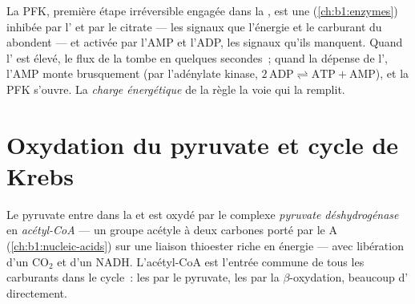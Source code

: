 \begin{proposition}\label{prop:b1:respiration-fermentation:pfk}
La PFK, première étape irréversible engagée dans la , est une
 (\cref{ch:b1:enzymes}) inhibée par l' et par le
citrate --- les signaux que l'énergie et le carburant du 
abondent --- et activée par l'AMP et l'ADP, les signaux qu'ils manquent.
Quand l' est élevé, le flux de la  tombe en quelques
secondes~; quand la  dépense de l', l'AMP monte brusquement
(par l'adénylate kinase,
$2\,\mathrm{ADP} \rightleftharpoons \mathrm{ATP} + \mathrm{AMP}$), et
la PFK s'ouvre. La \emph{charge énergétique} de la  règle la voie
qui la remplit.
\end{proposition}

\section{Oxydation du pyruvate et cycle de Krebs}

\begin{definition}\label{def:b1:respiration-fermentation:pdh}
Le pyruvate entre dans la  et est oxydé par le complexe
\emph{pyruvate déshydrogénase} en \emph{acétyl-CoA}
--- un groupe acétyle à deux carbones porté par le  A
(\cref{ch:b1:nucleic-acids}) sur une liaison thioester riche en énergie
--- avec libération d'un $\mathrm{CO_2}$ et d'un NADH. L'acétyl-CoA est
l'entrée commune de tous les carburants dans le cycle~: les  par
le pyruvate, les  par la $\beta$-oxydation, beaucoup d' directement.
\end{definition}

